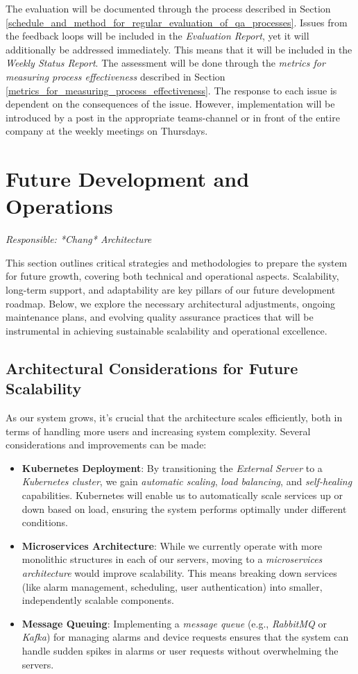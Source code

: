 \documentclass{article}
\begin{document}
The evaluation will be documented through the process described in Section \ref{schedule_and_method_for_regular_evaluation_of_qa_processes}. Issues from the feedback loops will be included in the \textit{Evaluation Report}, yet it will additionally be addressed immediately. This means that it will be included in the \textit{Weekly Status Report}. The assessment will be done through the \textit{metrics for measuring process effectiveness} described in Section \ref{metrics_for_measuring_process_effectiveness}. The response to each issue is dependent on the consequences of the issue. However, implementation will be introduced by a post in the appropriate teams-channel or in front of the entire company at the weekly meetings on Thursdays. 


\newpage
\section{Future Development and Operations}
\textit{Responsible: *Chang* Architecture}

This section outlines critical strategies and methodologies to prepare the system for future growth, covering both technical and operational aspects. Scalability, long-term support, and adaptability are key pillars of our future development roadmap. Below, we explore the necessary architectural adjustments, ongoing maintenance plans, and evolving quality assurance practices that will be instrumental in achieving sustainable scalability and operational excellence.

\subsection{Architectural Considerations for Future Scalability}

As our system grows, it’s crucial that the architecture scales efficiently, both in terms of handling more users and increasing system complexity. Several considerations and improvements can be made:

\begin{itemize}
    \item \textbf{Kubernetes Deployment}: By transitioning the \textit{External Server} to a \textit{Kubernetes cluster}, we gain \textit{automatic scaling}, \textit{load balancing}, and \textit{self-healing} capabilities. Kubernetes will enable us to automatically scale services up or down based on load, ensuring the system performs optimally under different conditions.
    \item \textbf{Microservices Architecture}: While we currently operate with more monolithic structures in each of our servers, moving to a \textit{microservices architecture} would improve scalability. This means breaking down services (like alarm management, scheduling, user authentication) into smaller, independently scalable components.
    \item \textbf{Message Queuing}: Implementing a \textit{message queue} (e.g., \textit{RabbitMQ} or \textit{Kafka}) for managing alarms and device requests ensures that the system can handle sudden spikes in alarms or user requests without overwhelming the servers.
\end{itemize}
\end{document}

